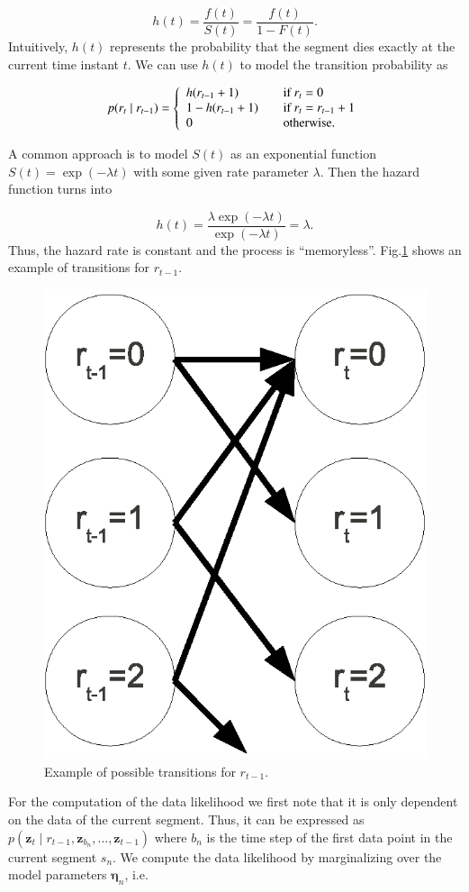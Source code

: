 \begin{equation}
\label{eqn:hazard}
h(t) = \frac{f(t)}{S(t)} = \frac{f(t)}{1 - F(t)}.
\end{equation}
Intuitively, $h(t)$ represents the probability that the segment dies
exactly at the current time instant $t$. We can use $h(t)$ to
model the transition probability as

\begin{equation}
\label{eqn:hazard}
p(r_t\mid r_{t-1}) = \left\{
\begin{array}{l l}
h(r_{t-1}+1) & \quad \text{if $r_t=0$ }\\
1 - h(r_{t-1}+1) & \quad \text{if $r_t=r_{t-1}+1$}\\
0 & \quad \text{otherwise}.
\end{array} \right.
\end{equation}


A common approach is to model $S(t)$ as an exponential function
$S(t)=\exp(-\lambda t)$ with some given rate parameter $\lambda$.  Then the
hazard function turns into

\begin{equation}
\label{eqn:hazard_exp}
h(t) = \frac{\lambda\exp(-\lambda t)}{\exp(-\lambda t)} = \lambda.
\end{equation}
Thus, the hazard rate is constant and the process
is  ``memoryless''. Fig.\ref{fig:transition}
shows an example of transitions for $r_{t-1}$.

\begin{figure}[t]
\centering
\includegraphics[width=0.5\columnwidth]{fig/transition.eps}
\caption{Example of possible transitions for $r_{t-1}$.}
\label{fig:transition}
\end{figure}

For the computation of the data likelihood we first note that it is
only dependent on the data of the current segment. Thus, it can be
expressed as $p(\mathbf{z}_t\mid r_{t-1}, \mathbf{z}_{b_n},\dots,\mathbf{z}_{t-1})$ where $b_n$
is the time step of the first data point in the current segment
$s_n$. We compute the data likelihood by marginalizing over the model
parameters $\boldsymbol{\eta}_n$, i.e.

